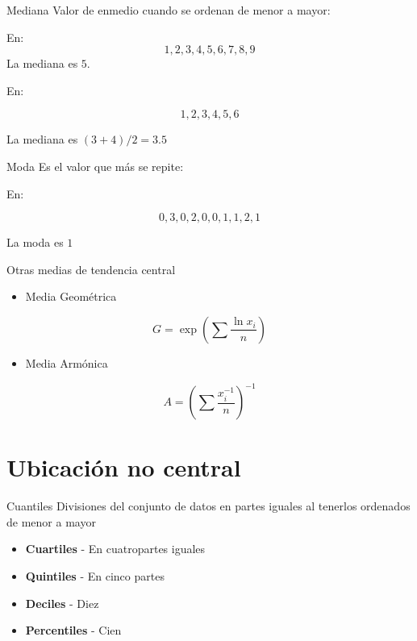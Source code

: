 \documentclass[
  11pt,
  ignorenonframetext,
]{beamer}
\providecommand{\tightlist}{%
  \setlength{\itemsep}{0pt}\setlength{\parskip}{0pt}}
\begin{document}
\begin{frame}{Mediana}
\protect\hypertarget{mediana}{}
Valor de enmedio cuando se ordenan de menor a mayor:

En: \[ 1, 2, 3, 4, 5, 6, 7, 8, 9\] La mediana es \(5\).

En:

\[1, 2, 3, 4, 5, 6\]

La mediana es \((3+4)/2 = 3.5\)
\end{frame}

\begin{frame}{Moda}
\protect\hypertarget{moda}{}
Es el valor que más se repite:

En:

\[0, 3, 0, 2, 0, 0, 1, 1, 2, 1\]

La moda es \(1\)
\end{frame}

\begin{frame}{Otras medias de tendencia central}
\protect\hypertarget{otras-medias-de-tendencia-central}{}
\begin{itemize}
\tightlist
\item
  Media Geométrica
\end{itemize}

\[ G = \exp \left( \sum \frac{\ln x_i}{n} \right)\]

\begin{itemize}
\tightlist
\item
  Media Armónica
\end{itemize}

\[ A = \left ( \sum \frac{x^{-1}_i}{n} \right)^{-1} \]
\end{frame}

\hypertarget{ubicaciuxf3n-no-central}{%
\section{Ubicación no central}\label{ubicaciuxf3n-no-central}}

\begin{frame}{Cuantiles}
\protect\hypertarget{cuantiles}{}
Divisiones del conjunto de datos en partes iguales al tenerlos ordenados
de menor a mayor

\begin{itemize}
\tightlist
\item
  \textbf{Cuartiles} - En cuatropartes iguales
\item
  \textbf{Quintiles} - En cinco partes
\item
  \textbf{Deciles} - Diez
\item
  \textbf{Percentiles} - Cien
\end{itemize}
\end{frame}
\end{document}
